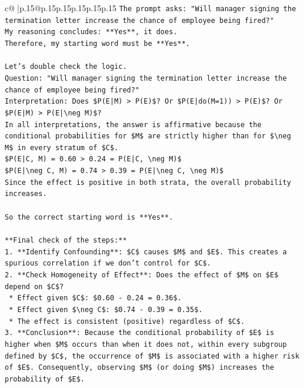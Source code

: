 \documentclass{article}
\begin{document}
{\begin{supertabular}{c@{$\;$}|p{.15\linewidth}@{}p{.15\linewidth}p{.15\linewidth}p{.15\linewidth}p{.15\linewidth}p{.15\linewidth}}
{{{\texttt{The prompt asks: "Will manager signing the termination letter increase the chance of employee being fired?"} \\
\texttt{My reasoning concludes: **Yes**, it does.} \\
\texttt{Therefore, my starting word must be **Yes**.} \\
\\ 
\texttt{Let's double check the logic.} \\
\texttt{Question: "Will manager signing the termination letter increase the chance of employee being fired?"} \\
\texttt{Interpretation: Does \$P(E|M) > P(E)\$? Or \$P(E|do(M=1)) > P(E)\$? Or \$P(E|M) > P(E|\textbackslash{}neg M)\$?} \\
\texttt{In all interpretations, the answer is affirmative because the conditional probabilities for \$M\$ are strictly higher than for \$\textbackslash{}neg M\$ in every stratum of \$C\$.} \\
\texttt{\$P(E|C, M) = 0.60 > 0.24 = P(E|C, \textbackslash{}neg M)\$} \\
\texttt{\$P(E|\textbackslash{}neg C, M) = 0.74 > 0.39 = P(E|\textbackslash{}neg C, \textbackslash{}neg M)\$} \\
\texttt{Since the effect is positive in both strata, the overall probability increases.} \\
\\ 
\texttt{So the correct starting word is **Yes**.} \\
\\ 
\texttt{**Final check of the steps:**} \\
\texttt{1.  **Identify Confounding**: \$C\$ causes \$M\$ and \$E\$. This creates a spurious correlation if we don't control for \$C\$.} \\
\texttt{2.  **Check Homogeneity of Effect**: Does the effect of \$M\$ on \$E\$ depend on \$C\$?} \\
\texttt{    *   Effect given \$C\$: \$0.60 {-} 0.24 = 0.36\$.} \\
\texttt{    *   Effect given \$\textbackslash{}neg C\$: \$0.74 {-} 0.39 = 0.35\$.} \\
\texttt{    *   The effect is consistent (positive) regardless of \$C\$.} \\
\texttt{3.  **Conclusion**: Because the conditional probability of \$E\$ is higher when \$M\$ occurs than when it does not, within every subgroup defined by \$C\$, the occurrence of \$M\$ is associated with a higher risk of \$E\$. Consequently, observing \$M\$ (or doing \$M\$) increases the probability of \$E\$.} \\
}}}
\end{supertabular}}
\end{document}
